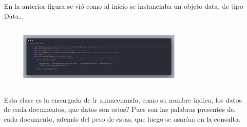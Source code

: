 \begin{frame}
    En la anterior figura se vió como al inicio se instanciaba un objeto data, de tipo Data\dots
    \begin{figure}
        \includegraphics[width=310px, height=120px]{Assets/data_filer.png}
    \end{figure}
    Esta clase es la encargada de ir almacenando, como su nombre indica, los datos de cada documentos, que datos son estos?
    Pues son las palabras presentes de, cada documento, además del peso de estas, que luego se usarían en la consulta.
\end{frame}

